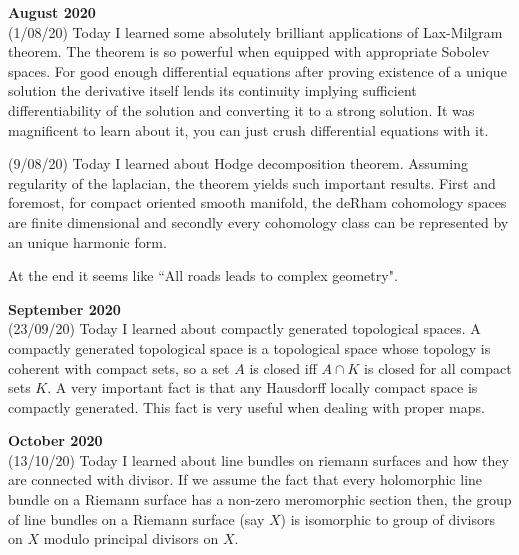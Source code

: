 \documentclass[12pt,a4paper]{article}
\begin{document}
\maketitle\textbf{August 2020}
\\

(1/08/20) Today I learned some absolutely brilliant applications of Lax-Milgram theorem. The theorem is so powerful when equipped with appropriate Sobolev spaces. For good enough differential equations after proving existence of a unique solution the derivative itself lends its continuity implying sufficient differentiability of the solution and converting it to a strong solution. It was magnificent to learn about it, you can just crush differential equations with it.

(9/08/20) Today I learned about Hodge decomposition theorem. Assuming regularity of the laplacian, the theorem yields such important results. First and foremost, for compact oriented smooth manifold, the deRham cohomology spaces are finite dimensional and secondly every cohomology class can be represented by an unique harmonic form. 

At the end it seems like ``All roads leads to complex geometry".\\

\maketitle\textbf{September 2020}
\\

(23/09/20) Today I learned about compactly generated topological spaces. A compactly generated topological space is a topological space whose topology is coherent with compact sets, so a set $A$ is closed iff $A \cap K$ is closed for all compact sets $K$. A very important fact is that any Hausdorff locally compact space is compactly generated. This fact is very useful when dealing with proper maps.\\ 
 
\maketitle\textbf{October 2020}
\\

(13/10/20) Today I learned about line bundles on riemann surfaces and how they are connected with divisor. If we assume the fact that every holomorphic line bundle on a Riemann surface has a non-zero meromorphic section then, the group of line bundles on a Riemann surface (say $X$) is isomorphic to group of divisors on $X$ modulo principal divisors on $X$.\\ 
\end{document}

